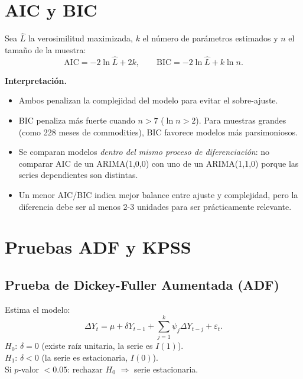 \documentclass[12pt,a4paper]{article}
\theoremstyle{definition}
\begin{document}
\section{AIC y BIC}

\begin{defbox}
Sea $\hat{L}$ la verosimilitud maximizada, $k$ el número de parámetros
estimados y $n$ el tamaño de la muestra:
\[
  \text{AIC} = -2\ln\hat{L} + 2k, \qquad
  \text{BIC} = -2\ln\hat{L} + k\ln n.
\]
\end{defbox}

\noindent\textbf{Interpretación.}
\begin{itemize}[nosep]
  \item Ambos penalizan la complejidad del modelo para evitar el sobre-ajuste.
  \item BIC penaliza más fuerte cuando $n > 7$ ($\ln n > 2$). Para muestras
        grandes (como 228 meses de commodities), BIC favorece modelos más
        parsimoniosos.
  \item Se comparan modelos \emph{dentro del mismo proceso de diferenciación}:
        no comparar AIC de un ARIMA(1,0,0) con uno de un ARIMA(1,1,0) porque
        las series dependientes son distintas.
  \item Un menor AIC/BIC indica mejor balance entre ajuste y complejidad, pero
        la diferencia debe ser al menos 2-3 unidades para ser prácticamente
        relevante.
\end{itemize}

\section{Pruebas ADF y KPSS}

\subsection{Prueba de Dickey-Fuller Aumentada (ADF)}

\begin{defbox}[ADF]
Estima el modelo:
\[
  \Delta Y_t = \mu + \delta Y_{t-1} + \sum_{j=1}^{k}\psi_j \Delta Y_{t-j} + \varepsilon_t.
\]
$H_0$: $\delta = 0$ (existe raíz unitaria, la serie es $I(1)$).\\
$H_1$: $\delta < 0$ (la serie es estacionaria, $I(0)$).\\
Si $p$-valor $< 0.05$: rechazar $H_0$ $\Rightarrow$ serie estacionaria.
\end{defbox}
\end{document}
